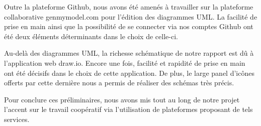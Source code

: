 \par Outre la plateforme Github, nous avons été amenés à travailler sur la plateforme collaborative genmymodel.com pour l'édition des diagrammes UML. La facilité de prise en main ainsi que la possibilité de se connecter via nos comptes Github ont été deux éléments déterminants dans le choix de celle-ci.

\par Au-delà des diagrammes UML, la richesse schématique de notre rapport est dû à l'application web draw.io. Encore une fois, facilité et rapidité de prise en main ont été décisifs dans le choix de cette application. De plus, le large panel d'icônes offerts par cette dernière nous a permis de réaliser des schémas très précis.

\par Pour conclure ces préliminaires, nous avons mis tout au long de notre projet l'accent sur le travail coopératif via l'utilisation de plateformes proposant de tels services. 

